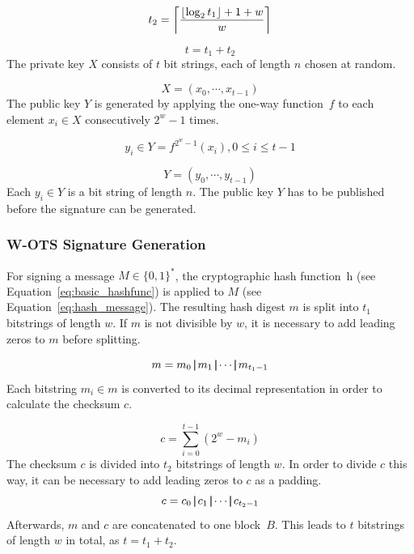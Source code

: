 \begin{equation}
\label{eq:t2}
t_2 = \ceil*{\frac{\floor*{\log_2 t_1} + 1 + w}{w} }
\end{equation}

\begin{equation}
\label{eq:t}
t = t_1 + t_2
\end{equation}
The private key $X$ consists of $t$ bit strings, each of length $n$ chosen at random.

\begin{equation}
\label{eq:wots_privkey}
X = (x_0, \cdots, x_{t-1})
\end{equation}
The public key $Y$ is generated by applying the one-way function~$f$ to each element $x_i  \in X$  consecutively $2^w - 1$ times. %

\begin{equation}
y_i \in Y =  f^{2^w-1}(x_i), 0 \leq i \leq t-1 
\end{equation}

\begin{equation}
Y = (y_0, \cdots, y_{t-1})
\end{equation}
Each $y_i \in Y$ is a bit string of length $n$. The public key $Y$ has to be published before the signature can be generated.

\subsubsection{W-OTS Signature Generation}
For signing a message $M \in \lbrace 0,1 \rbrace^*$, the cryptographic hash function~h (see Equation~\ref{eq:basic_hashfunc}) is applied to $M$ (see Equation~\ref{eq:hash_message}). The resulting hash digest $m$ is split into $t_1$ bitstrings of length $w$. If $m$ is not divisible by $w$, it is necessary to add leading zeros to $m$ before splitting.

\begin{equation}
\label{eq:hash_digest_split}
m = m_0 \concat m_1 \concat \cdots \concat m_{t_1-1}
\end{equation}
Each bitstring $m_i \in m$ is converted to its decimal representation in order to calculate the checksum $c$.

\begin{equation}
\label{eq:checksum_calculation}
c = \sum_{i = 0}^{t-1}(2^w-m_i)
\end{equation}
The checksum $c$ is divided into $t_2$ bitstrings of length $w$. In order to divide $c$ this way, it can be necessary to add leading zeros to $c$ as a padding.
\begin{equation}
c = c_0 \operatorname{|\!\!|} c_1 \operatorname{|\!\!|} \cdots \operatorname{|\!\!|} c_{t_2 - 1}
\end{equation}
Afterwards, $m$ and $c$ are concatenated to one block~$B$. This leads to $t$ bitstrings of length $w$ in total, as $t = t_1 + t_2$.


